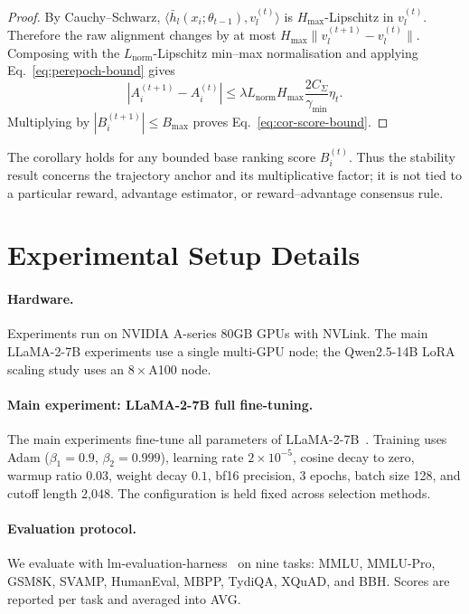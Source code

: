 \begin{proof}
By Cauchy--Schwarz,
$\langle \bar h_l(x_i;\theta_{t-1}),v_l^{(t)}\rangle$ is
$H_{\max}$-Lipschitz in $v_l^{(t)}$. Therefore the raw alignment
changes by at most
$H_{\max}\|v_l^{(t+1)}-v_l^{(t)}\|$. Composing with the
$L_{\mathrm{norm}}$-Lipschitz min--max normalisation and applying
Eq.~\ref{eq:perepoch-bound} gives
\[
|A_i^{(t+1)}-A_i^{(t)}|
\le
\lambda L_{\mathrm{norm}}H_{\max}
\frac{2C_\Sigma}{\gamma_{\min}}\eta_t .
\]
Multiplying by $|B_i^{(t+1)}|\le B_{\max}$ proves
Eq.~\ref{eq:cor-score-bound}.
\end{proof}

The corollary holds for any bounded base ranking score
$B_i^{(t)}$. Thus the stability result concerns the trajectory
anchor and its multiplicative factor; it is not tied to a particular
reward, advantage estimator, or reward--advantage consensus rule.

\section{Experimental Setup Details}
\label{app:setup-details}

\paragraph{Hardware.}
Experiments run on NVIDIA A-series 80GB GPUs with NVLink. The main
LLaMA-2-7B experiments use a single multi-GPU node; the Qwen2.5-14B
LoRA scaling study uses an $8\times$A100 node.

\paragraph{Main experiment: LLaMA-2-7B full fine-tuning.}
The main experiments fine-tune all parameters of
LLaMA-2-7B~\cite{touvron2023llama2}. Training uses Adam
($\beta_1=0.9$, $\beta_2=0.999$), learning rate $2\times10^{-5}$,
cosine decay to zero, warmup ratio $0.03$, weight decay $0.1$, bf16
precision, 3 epochs, batch size 128, and cutoff length 2{,}048. The
configuration is held fixed across selection methods.

\paragraph{Evaluation protocol.}
We evaluate with lm-evaluation-harness~\cite{eval-harness} on nine
tasks: MMLU, MMLU-Pro, GSM8K, SVAMP, HumanEval, MBPP, TydiQA,
XQuAD, and BBH. Scores are reported per task and averaged into AVG.

